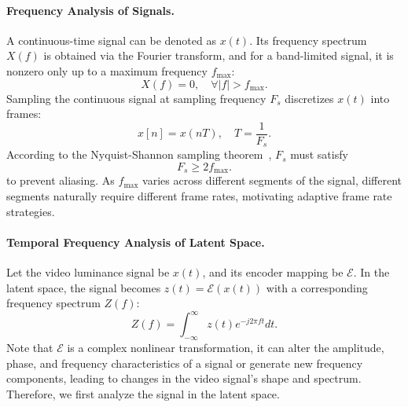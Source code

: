 \paragraph{Frequency Analysis of Signals.}

A continuous-time signal can be denoted as $x(t)$. Its frequency spectrum $X(f)$ is obtained via the Fourier transform, and for a  band-limited signal, it is nonzero only up to a maximum frequency $f_{\max}$:
\begin{equation}
X(f) = 0, \quad \forall|f| > f_{\max}.
\end{equation}
Sampling the continuous signal at sampling frequency $F_s$ discretizes $x(t)$ into frames:
\begin{equation}
x[n] = x(nT), \quad T = \frac{1}{F_s}.
\end{equation}
According to the Nyquist-Shannon sampling theorem~\cite{Nyquist_theory,shannon_noise}, $F_s$ must satisfy
\begin{equation}
F_s \geq 2f_{\max}.
\end{equation}
to prevent aliasing. As $f_{\max}$ varies across different segments of the signal, different segments naturally require different frame rates, motivating adaptive frame rate strategies.

\paragraph{Temporal Frequency Analysis of Latent Space.}
Let the video luminance signal be $x(t)$, and its encoder mapping be $\mathcal{E}$. In the latent space, the signal becomes $z(t) = \mathcal{E}(x(t))$ with a  corresponding frequency spectrum $Z(f)$:
\begin{equation}
Z(f) = \int_{-\infty}^{\infty} z(t)e^{-j2\pi ft} dt.
\end{equation}
Note that $\mathcal{E}$ is a complex nonlinear transformation, it can alter the amplitude, phase, and frequency characteristics of a signal or generate new frequency components, leading to changes in the video signal's shape and spectrum.
Therefore, we first analyze the signal in the latent space.



